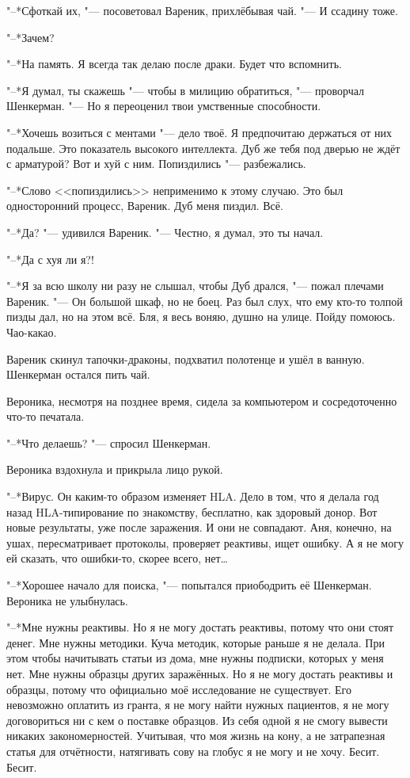 "--*Сфоткай их, "--- посоветовал Вареник, прихлёбывая чай.
"--- И ссадину тоже.

"--*Зачем?

"--*На память.
Я всегда так делаю после драки.
Будет что вспомнить.

"--*Я думал, ты скажешь "--- чтобы в милицию обратиться, "--- проворчал Шенкерман.
"--- Но я переоценил твои умственные способности.

"--*Хочешь возиться с ментами "--- дело твоё.
Я предпочитаю держаться от них подальше.
Это показатель высокого интеллекта.
Дуб же тебя под дверью не ждёт с арматурой?
Вот и хуй с ним.
Попиздились "--- разбежались.

"--*Слово <<попиздились>> неприменимо к этому случаю.
Это был односторонний процесс, Вареник.
Дуб меня пиздил.
Всё.

"--*Да? "--- удивился Вареник.
"--- Честно, я думал, это ты начал.

"--*Да с хуя ли я?!

"--*Я за всю школу ни разу не слышал, чтобы Дуб дрался, "--- пожал плечами Вареник.
"--- Он большой шкаф, но не боец.
Раз был слух, что ему кто-то толпой пизды дал, но на этом всё.
Бля, я весь воняю, душно на улице.
Пойду помоюсь.
Чао-какао.

Вареник скинул тапочки-драконы, подхватил полотенце и ушёл в ванную.
Шенкерман остался пить чай.

Вероника, несмотря на позднее время, сидела за компьютером и сосредоточенно что-то печатала.

"--*Что делаешь? "--- спросил Шенкерман.

Вероника вздохнула и прикрыла лицо рукой.

"--*Вирус.
Он каким-то образом изменяет HLA.
Дело в том, что я делала год назад HLA-типирование по знакомству, бесплатно, как здоровый донор.
Вот новые результаты, уже после заражения.
И они не совпадают.
Аня, конечно, на ушах, пересматривает протоколы, проверяет реактивы, ищет ошибку.
А я не могу ей сказать, что ошибки-то, скорее всего, нет\ldots{}

"--*Хорошее начало для поиска, "--- попытался приободрить её Шенкерман.
Вероника не улыбнулась.

"--*Мне нужны реактивы.
Но я не могу достать реактивы, потому что они стоят денег.
Мне нужны методики.
Куча методик, которые раньше я не делала.
При этом чтобы начитывать статьи из дома, мне нужны подписки, которых у меня нет.
Мне нужны образцы других заражённых.
Но я не могу достать реактивы и образцы, потому что официально моё исследование не существует.
Его невозможно оплатить из гранта, я не могу найти нужных пациентов, я не могу договориться ни с кем о поставке образцов.
Из себя одной я не смогу вывести никаких закономерностей.
Учитывая, что моя жизнь на кону, а не затрапезная статья для отчётности, натягивать сову на глобус я не могу и не хочу.
Бесит.
Бесит.

